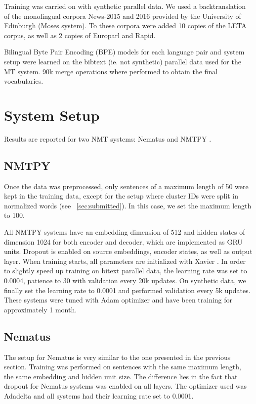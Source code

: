 \documentclass[11pt,letterpaper,final]{article}
\begin{document}
Training was carried on with synthetic parallel data. We used a backtranslation
of the monolingual corpora News-2015 and 2016 provided
by the University of Edinburgh (Moses system). To these
corpora were added 10 copies of the LETA corpus, as well
as 2 copies of Europarl and Rapid.

Bilingual Byte Pair Encoding (BPE) models \cite{Sennrich16BPE}
for each language pair and system setup
were learned on the bibtext (ie. not synthetic) parallel data used for
the MT system. 90k merge operations where performed
to obtain the final vocabularies.


\section{System Setup}
\label{sec:sys_setup}

Results are reported for two NMT systems: Nematus \cite{nematus17}
and NMTPY \cite{caglayan17nmtpy}. %


\subsection{NMTPY}

Once the data was preprocessed, only sentences of a maximum
length of 50 were kept in the training data, except for the
setup where cluster IDs were split in normalized words (see \textsection~\ref{sec:submitted}).
In this case, we set the maximum length to 100.

All NMTPY systems have an
embedding dimension of 512 and hidden states of dimension
1024 for both encoder and decoder, which are implemented
as GRU units. Dropout is enabled on source embeddings,
encoder states, as well as output layer.
When training starts, all parameters are
initialized with Xavier \cite{glorotxavier}. In order to slightly speed up
training on bitext parallel data, the learning rate
was set to 0.0004, patience to 30 with validation every
20k updates. On synthetic data, we finally set the learning
rate to 0.0001 and performed validation every 5k updates.
These systems were tuned with Adam optimizer \cite{kingma2014adam} and
have been training for approximately 1 month.


\subsection{Nematus}

The setup for Nematus is very similar to the one
presented in the previous section. Training was performed
on sentences with the same maximum length, the same
embedding and hidden unit size. The difference lies
in the fact that dropout for Nematus systems was
enabled on all layers. The optimizer used was Adadelta \cite{zeiler2012adadelta}
and all systems had their learning rate set to 0.0001. 
\end{document}
